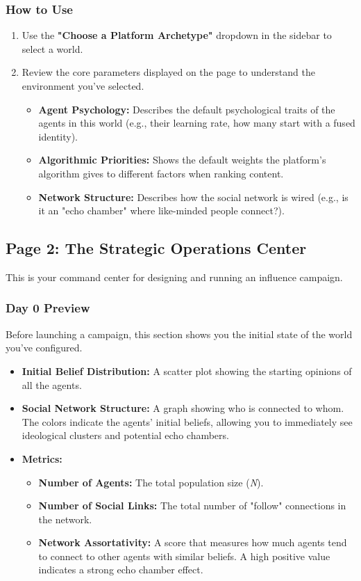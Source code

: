\documentclass[11pt, a4paper]{article}
\begin{document}
\subsubsection*{How to Use}
\begin{enumerate}
    \item Use the \textbf{"Choose a Platform Archetype"} dropdown in the sidebar to select a world.
    \item Review the core parameters displayed on the page to understand the environment you've selected.
    \begin{itemize}
        \item \textbf{Agent Psychology:} Describes the default psychological traits of the agents in this world (e.g., their learning rate, how many start with a fused identity).
        \item \textbf{Algorithmic Priorities:} Shows the default weights the platform's algorithm gives to different factors when ranking content.
        \item \textbf{Network Structure:} Describes how the social network is wired (e.g., is it an "echo chamber" where like-minded people connect?).
    \end{itemize}
\end{enumerate}

\subsection{Page 2: The Strategic Operations Center}

This is your command center for designing and running an influence campaign.

\subsubsection{Day 0 Preview}
Before launching a campaign, this section shows you the initial state of the world you've configured.
\begin{itemize}
    \item \textbf{Initial Belief Distribution:} A scatter plot showing the starting opinions of all the agents.
    \item \textbf{Social Network Structure:} A graph showing who is connected to whom. The colors indicate the agents' initial beliefs, allowing you to immediately see ideological clusters and potential echo chambers.
    \item \textbf{Metrics:}
    \begin{itemize}
        \item \textbf{Number of Agents:} The total population size (\textit{N}).
        \item \textbf{Number of Social Links:} The total number of "follow" connections in the network.
        \item \textbf{Network Assortativity:} A score that measures how much agents tend to connect to other agents with similar beliefs. A high positive value indicates a strong echo chamber effect.
    \end{itemize}
\end{itemize}
\end{document}
